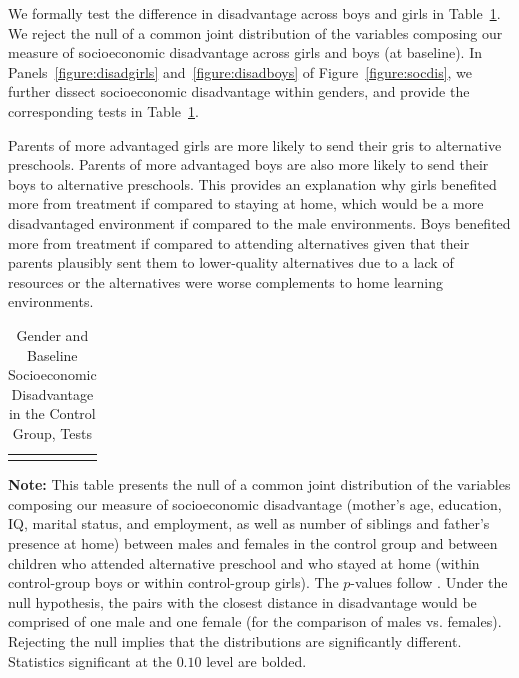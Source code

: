We formally test the difference in disadvantage across boys and girls in Table~\ref{table:disadtests}. We reject the null of a common joint distribution of the variables composing our measure of socioeconomic disadvantage across girls and boys (at baseline). In Panels~\ref{figure:disadgirls} and~\ref{figure:disadboys} of Figure~\ref{figure:socdis}, we further dissect socioeconomic disadvantage within genders, and provide the corresponding tests in Table~\ref{table:disadtests}. 

Parents of more advantaged girls are more likely to send their gris to alternative preschools. Parents of more advantaged boys are also more likely to send their boys to alternative preschools. This provides an explanation why girls benefited more from treatment if compared to staying at home, which would be a more disadvantaged environment if compared to the male environments. Boys benefited more from treatment if compared to attending alternatives given that their parents plausibly sent them to lower-quality alternatives due to a lack of resources or the alternatives were worse complements to home learning environments. 

\begin{table}[!htpb]
\begin{threeparttable}
\caption{Gender and Baseline Socioeconomic Disadvantage in the Control Group, Tests} \label{table:disadtests}
\centering 
\begin{tabularx}{16.5cm}{XcX}
&  & 
\end{tabularx}
\begin{tablenotes}
\footnotesize
\item \textbf{Note:} This table presents the null of a common joint distribution of the variables composing our measure of socioeconomic disadvantage (mother's age, education, IQ, marital status, and employment, as well as number of siblings and father's presence at home) between males and females in the control group and between children who attended  alternative preschool and who stayed at home (within control-group boys or within control-group girls). The $p$-values follow \citet{Rosenbaum_2005_Distribution_JRSS}. Under the null hypothesis, the pairs with the closest distance in disadvantage would be comprised of one male and one female (for the comparison of males vs. females). Rejecting the null implies that the distributions are significantly different. Statistics significant at the $0.10$ level are bolded.
\end{tablenotes}
\end{threeparttable}
\end{table}










